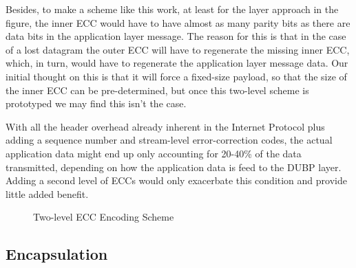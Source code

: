 \documentclass[conference]{IEEEtran}
\theoremstyle{definition}
\begin{document}
Besides, to make a scheme like this work, at least for the layer
approach in the figure, the inner ECC would have to have almost
as many parity bits as there are data bits in the application layer
message.  The reason for this is that in the case of a lost datagram
the outer ECC will have to regenerate the missing inner ECC, which,
in turn, would have to regenerate the application layer message data.
Our initial thought on this is that it will force a fixed-size
payload, so that the size of the inner ECC can be pre-determined,
but once this two-level scheme is prototyped we may find this
isn't the case.

With all the header overhead already inherent in the Internet
Protocol plus adding a sequence number and stream-level error-correction
codes, the actual application data might end up only accounting for
20-40\% of the data transmitted, depending on how the application
data is feed to the DUBP layer.  Adding a second level of ECCs
would only exacerbate this condition and provide little added benefit.


\begin{figure}[h!]                                                          %
\centering                                                                  %
\resizebox{0.4\textwidth}{!}{}
\caption{Two-level ECC Encoding Scheme}                                     %
\label{two_level_scheme}                                                    %
\end{figure}                                                                %


\subsection{Encapsulation}
\end{document}
